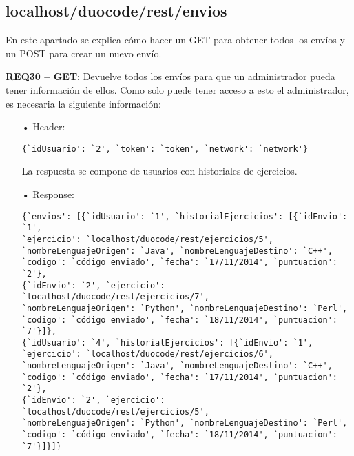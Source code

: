 \subsection{localhost/duocode/rest/envios}
En este apartado se explica cómo hacer un GET para obtener todos los envíos y un POST para crear un nuevo envío.

\textbf{REQ30 – GET}: Devuelve todos los envíos para que un administrador pueda tener información de ellos. Como solo puede tener acceso a esto el administrador, es necesaria la siguiente información:
\begin{itemize}
\item[•]
Header: 
{\codesize
\begin{verbatim}
{`idUsuario': `2', `token': `token', `network': `network'}
\end{verbatim}
}

La respuesta se compone de usuarios con historiales de ejercicios.
\item[•]
Response: 
{\codesize
\begin{verbatim}
{`envios': [{`idUsuario': `1', `historialEjercicios': [{`idEnvio': `1', 
`ejercicio': `localhost/duocode/rest/ejercicios/5', 
`nombreLenguajeOrigen': `Java', `nombreLenguajeDestino': `C++', 
`codigo': `código enviado', `fecha': `17/11/2014', `puntuacion': `2'}, 
{`idEnvio': `2', `ejercicio': `localhost/duocode/rest/ejercicios/7', 
`nombreLenguajeOrigen': `Python', `nombreLenguajeDestino': `Perl', 
`codigo': `código enviado', `fecha': `18/11/2014', `puntuacion': `7'}]}, 
{`idUsuario': `4', `historialEjercicios': [{`idEnvio': `1', 
`ejercicio': `localhost/duocode/rest/ejercicios/6', 
`nombreLenguajeOrigen': `Java', `nombreLenguajeDestino': `C++', 
`codigo': `código enviado', `fecha': `17/11/2014', `puntuacion': `2'}, 
{`idEnvio': `2', `ejercicio': `localhost/duocode/rest/ejercicios/5', 
`nombreLenguajeOrigen': `Python', `nombreLenguajeDestino': `Perl', 
`codigo': `código enviado', `fecha': `18/11/2014', `puntuacion': `7'}]}]}
\end{verbatim}
}
\end{itemize}

